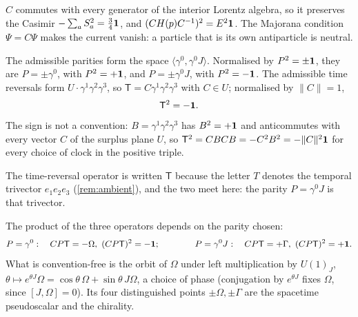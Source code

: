 \begin{corollary}
$C$ commutes with every generator of the interior Lorentz algebra, so it preserves the Casimir $-\sum_aS_a^2=\tfrac34\mathbf 1$, and
$(CH(p)C^{-1})^2=E^2\mathbf 1$. The Majorana condition $\Psi=C\Psi$ makes the current vanish: a particle that is its own antiparticle is
neutral.
\end{corollary}

\begin{theorem}
\label{thm:PT}
The admissible parities form the space $\langle\gamma^0,\gamma^0J\rangle$. Normalised by $P^2=\pm\mathbf 1$, they are $P=\pm\gamma^0$, with $P^2=+\mathbf 1$,
and $P=\pm\gamma^0J$, with $P^2=-\mathbf 1$. The admissible time reversals form $U\cdot\gamma^1\gamma^2\gamma^3$, so $\mathsf T=C\gamma^1\gamma^2\gamma^3$
with $C\in U$; normalised by $\|C\|=1$,
\[
\mathsf T^2=-\mathbf 1 .
\]
The sign is not a convention: $B=\gamma^1\gamma^2\gamma^3$ has $B^2=+\mathbf 1$ and anticommutes with every vector $C$ of the surplus plane $U$, so
$\mathsf T^2=CBCB=-C^2B^2=-\|C\|^2\mathbf 1$ for every choice of clock in the positive triple.
\end{theorem}

The time-reversal operator is written $\mathsf T$ because the letter $T$ denotes the temporal trivector $e_1e_2e_3$ (\cref{rem:ambient}), and the
two meet here: the parity $P=\gamma^0J$ is that trivector.

\begin{theorem}
\label{thm:CPT}
The product of the three operators depends on the parity chosen:
\[
P=\gamma^0:\quad CP\mathsf T=-\Omega,\ (CP\mathsf T)^2=-\id;\qquad\qquad P=\gamma^0J:\quad CP\mathsf T=+\Gamma,\ (CP\mathsf T)^2=+\id .
\]
What is convention-free is the orbit of $\Omega$ under left multiplication by $U(1)_J$, $\theta\mapsto e^{\theta J}\Omega=\cos\theta\,\Omega+\sin\theta\,J\Omega$,
a choice of phase (conjugation by $e^{\theta J}$ fixes $\Omega$, since $[J,\Omega]=0$). Its four distinguished points $\pm\Omega,\pm\Gamma$ are the
spacetime pseudoscalar and the chirality.
\end{theorem}

